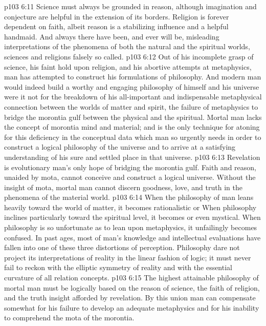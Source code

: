 \pc \vs p103 6:11 Science must always be grounded in reason, although imagination and conjecture are helpful in the extension of its borders. Religion is forever dependent on faith, albeit reason is a stabilizing influence and a helpful handmaid. And always there have been, and ever will be, misleading interpretations of the phenomena of both the natural and the spiritual worlds, sciences and religions falsely so called.\plusone
\vs p103 6:12 Out of his incomplete grasp of science, his faint hold upon religion, and his abortive attempts at metaphysics, man has attempted to construct his formulations of philosophy. And modern man would indeed build a worthy and engaging philosophy of himself and his universe were it not for the breakdown of his all\hyp{}important and indispensable metaphysical connection between the worlds of matter and spirit, the failure of metaphysics to bridge the morontia gulf between the physical and the spiritual. Mortal man lacks the concept of morontia mind and material; and  is the only technique for atoning for this deficiency in the conceptual data which man so urgently needs in order to construct a logical philosophy of the universe and to arrive at a satisfying understanding of his sure and settled place in that universe.
\vs p103 6:13 Revelation is evolutionary man’s only hope of bridging the morontia gulf. Faith and reason, unaided by mota, cannot conceive and construct a logical universe. Without the insight of mota, mortal man cannot discern goodness, love, and truth in the phenomena of the material world.
\vs p103 6:14 When the philosophy of man leans heavily toward the world of matter, it becomes rationalistic or  When philosophy inclines particularly toward the spiritual level, it becomes  or even mystical. When philosophy is so unfortunate as to lean upon metaphysics, it unfailingly becomes  confused. In past ages, most of man’s knowledge and intellectual evaluations have fallen into one of these three distortions of perception. Philosophy dare not project its interpretations of reality in the linear fashion of logic; it must never fail to reckon with the elliptic symmetry of reality and with the essential curvature of all relation concepts.
\vs p103 6:15 The highest attainable philosophy of mortal man must be logically based on the reason of science, the faith of religion, and the truth insight afforded by revelation. By this union man can compensate somewhat for his failure to develop an adequate metaphysics and for his inability to comprehend the mota of the morontia.
